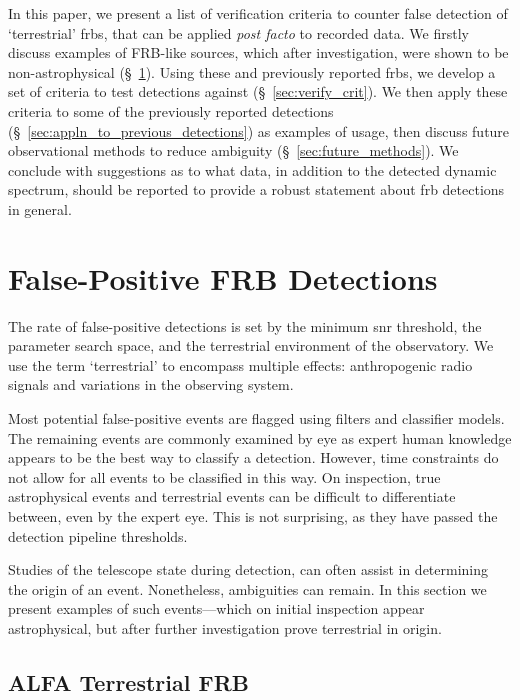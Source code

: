 \documentclass[a4paper,fleqn,usenatbib]{mnras}
\begin{document}
In this paper, we present a list of verification criteria to counter false
detection of `terrestrial' \glspl{frb}, that can be applied \emph{post facto} to
recorded data. We firstly discuss examples of FRB-like sources, which after
investigation, were shown to be non-astrophysical (\S~\ref{sec:false-pos}).
Using these and previously reported \glspl{frb}, we develop a set of criteria to
test detections against (\S~\ref{sec:verify_crit}). We then apply these criteria
to some of the previously reported detections
(\S~\ref{sec:appln_to_previous_detections}) as examples of usage, then discuss
future observational methods to reduce ambiguity (\S~\ref{sec:future_methods}).
We conclude with suggestions as to what data, in addition to the detected
dynamic spectrum, should be reported to provide a robust statement about
\gls{frb} detections in general.

\section{False-Positive FRB Detections}
\label{sec:false-pos}

The rate of false-positive detections is set by the minimum \gls{snr} threshold,
the parameter search space, and the terrestrial environment of the observatory.
We use the term `terrestrial' to encompass multiple effects: anthropogenic radio
signals and variations in the observing system.

Most potential false-positive events are flagged using filters and classifier
models.  The remaining events are commonly examined by eye as expert human
knowledge appears to be the best way to classify a detection. However, time
constraints do not allow for all events to be classified in this way. On
inspection, true astrophysical events and terrestrial events can be difficult to
differentiate between, even by the expert eye.  This is not surprising, as they
have passed the detection pipeline thresholds.

Studies of the telescope state during detection, can often assist in determining
the origin of an event. Nonetheless, ambiguities can remain.  In this section we
present examples of such events---which on initial inspection appear
astrophysical, but after further investigation prove terrestrial in origin.

\subsection{ALFA Terrestrial FRB}
\label{sec:D20161204}
\end{document}
